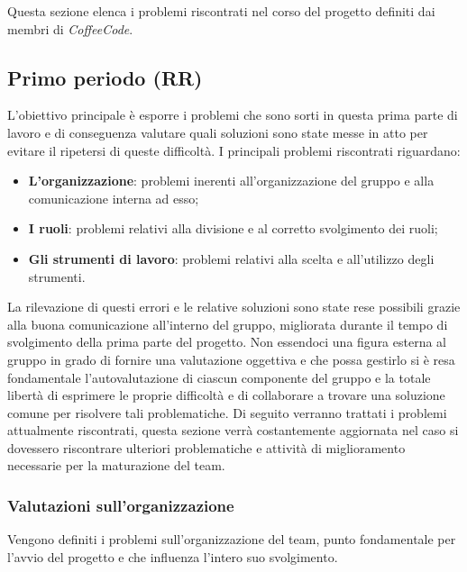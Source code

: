 \documentclass[../piano-di-qualifica.tex]{subfiles}
\begin{document}
Questa sezione elenca i problemi riscontrati nel corso del progetto definiti dai membri di \emph{CoffeeCode}.

\subsection{Primo periodo (RR)}
L'obiettivo principale è esporre i problemi che sono sorti in questa prima parte di lavoro e di conseguenza valutare quali soluzioni sono state messe in atto per evitare il ripetersi di queste difficoltà.
I principali problemi riscontrati riguardano:
\begin{itemize}
    \item \textbf{L'organizzazione}: problemi inerenti all'organizzazione del gruppo e alla comunicazione interna ad esso;
    \item \textbf{I ruoli}: problemi relativi alla divisione e al corretto svolgimento dei ruoli;
    \item \textbf{Gli strumenti di lavoro}: problemi relativi alla scelta e all'utilizzo degli strumenti.
\end{itemize}
La rilevazione di questi errori e le relative soluzioni sono state rese possibili grazie alla buona comunicazione all'interno del gruppo, migliorata durante il tempo di svolgimento della prima parte del progetto.
Non essendoci una figura esterna al gruppo in grado di fornire una valutazione oggettiva e che possa gestirlo si è resa fondamentale l'autovalutazione di ciascun componente del gruppo e la totale libertà di esprimere le proprie difficoltà e di collaborare a trovare una soluzione comune per risolvere tali problematiche.
Di seguito verranno trattati i problemi attualmente riscontrati, questa sezione verrà costantemente aggiornata nel caso si dovessero riscontrare ulteriori problematiche e attività di miglioramento necessarie per la maturazione del team.

\subsubsection{Valutazioni sull’organizzazione}
\label{sub:valutazioni_organizzazione}
Vengono definiti i problemi sull'organizzazione del team, punto fondamentale per l'avvio del progetto e che influenza l'intero suo svolgimento.
\end{document}

